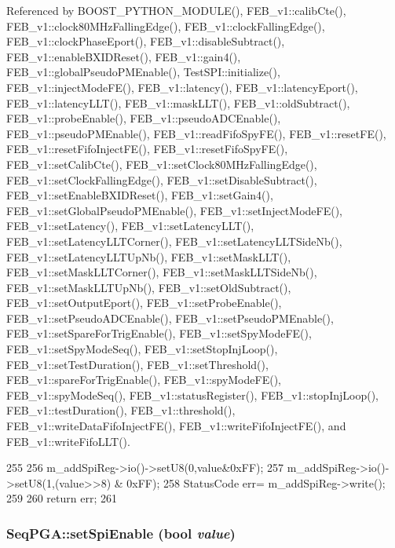 Referenced by BOOST\_\-PYTHON\_\-MODULE(), FEB\_\-v1::calibCte(), FEB\_\-v1::clock80MHzFallingEdge(), FEB\_\-v1::clockFallingEdge(), FEB\_\-v1::clockPhaseEport(), FEB\_\-v1::disableSubtract(), FEB\_\-v1::enableBXIDReset(), FEB\_\-v1::gain4(), FEB\_\-v1::globalPseudoPMEnable(), TestSPI::initialize(), FEB\_\-v1::injectModeFE(), FEB\_\-v1::latency(), FEB\_\-v1::latencyEport(), FEB\_\-v1::latencyLLT(), FEB\_\-v1::maskLLT(), FEB\_\-v1::oldSubtract(), FEB\_\-v1::probeEnable(), FEB\_\-v1::pseudoADCEnable(), FEB\_\-v1::pseudoPMEnable(), FEB\_\-v1::readFifoSpyFE(), FEB\_\-v1::resetFE(), FEB\_\-v1::resetFifoInjectFE(), FEB\_\-v1::resetFifoSpyFE(), FEB\_\-v1::setCalibCte(), FEB\_\-v1::setClock80MHzFallingEdge(), FEB\_\-v1::setClockFallingEdge(), FEB\_\-v1::setDisableSubtract(), FEB\_\-v1::setEnableBXIDReset(), FEB\_\-v1::setGain4(), FEB\_\-v1::setGlobalPseudoPMEnable(), FEB\_\-v1::setInjectModeFE(), FEB\_\-v1::setLatency(), FEB\_\-v1::setLatencyLLT(), FEB\_\-v1::setLatencyLLTCorner(), FEB\_\-v1::setLatencyLLTSideNb(), FEB\_\-v1::setLatencyLLTUpNb(), FEB\_\-v1::setMaskLLT(), FEB\_\-v1::setMaskLLTCorner(), FEB\_\-v1::setMaskLLTSideNb(), FEB\_\-v1::setMaskLLTUpNb(), FEB\_\-v1::setOldSubtract(), FEB\_\-v1::setOutputEport(), FEB\_\-v1::setProbeEnable(), FEB\_\-v1::setPseudoADCEnable(), FEB\_\-v1::setPseudoPMEnable(), FEB\_\-v1::setSpareForTrigEnable(), FEB\_\-v1::setSpyModeFE(), FEB\_\-v1::setSpyModeSeq(), FEB\_\-v1::setStopInjLoop(), FEB\_\-v1::setTestDuration(), FEB\_\-v1::setThreshold(), FEB\_\-v1::spareForTrigEnable(), FEB\_\-v1::spyModeFE(), FEB\_\-v1::spyModeSeq(), FEB\_\-v1::statusRegister(), FEB\_\-v1::stopInjLoop(), FEB\_\-v1::testDuration(), FEB\_\-v1::threshold(), FEB\_\-v1::writeDataFifoInjectFE(), FEB\_\-v1::writeFifoInjectFE(), and FEB\_\-v1::writeFifoLLT().


\begin{DoxyCode}
255                                                      {
256   m_addSpiReg->io()->setU8(0,value&0xFF);
257   m_addSpiReg->io()->setU8(1,(value>>8) & 0xFF);
258   StatusCode err= m_addSpiReg->write();
259  
260   return err;
261 }
\end{DoxyCode}
\hypertarget{classSeqPGA_a39a6cf702c9185793f59a8a05f3a9de7}{
\subsubsection[{setSpiEnable}]{ SeqPGA::setSpiEnable (bool {\em value})}}
\label{classSeqPGA_a39a6cf702c9185793f59a8a05f3a9de7}



